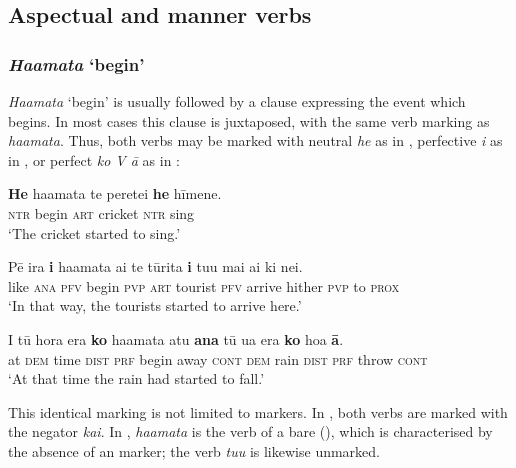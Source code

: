 \subsection{Aspectual and manner verbs}\label{sec:11.3.2}
\subsubsection{\textit{Ha{\ꞌ}amata} ‘begin’}\label{sec:11.3.2.1}
\textit{Ha{\ꞌ}amata} ‘begin’ is usually followed by a clause expressing the event which begins. In most cases this clause is juxtaposed, with the same verb marking as \textit{\mbox{ha{\ꞌ}amata}}. Thus, both verbs may be marked with neutral \textit{he} as in , perfective \textit{i} as in , or perfect \textit{ko V {\ꞌ}ā} as in :

\ea\label{ex:11.42}
\gll \textbf{He} ha{\ꞌ}amata te perete{\ꞌ}i \textbf{he} hīmene. \\
\textsc{ntr} begin \textsc{art} cricket \textsc{ntr} sing \\

\glt 
‘The cricket started to sing.’ \textstyleExampleref{[R212.052]} 
\z

\ea\label{ex:11.43}
\gll Pē ira \textbf{i} ha{\ꞌ}amata ai te tūrita \textbf{i} tu{\ꞌ}u mai ai ki nei.\\
like \textsc{ana} \textsc{pfv} begin \textsc{pvp} \textsc{art} tourist \textsc{pfv} arrive hither \textsc{pvp} to \textsc{prox}\\

\glt 
‘In that way, the tourists started to arrive here.’ \textstyleExampleref{[R376.076]} 
\z

\ea\label{ex:11.44}
\gll {\ꞌ}I tū hora era \textbf{ko} ha{\ꞌ}amata atu \textbf{{\ꞌ}ana} tū {\ꞌ}ua era \textbf{ko} hoa \textbf{{\ꞌ}ā}.\\
at \textsc{dem} time \textsc{dist} \textsc{prf} begin away \textsc{cont} \textsc{dem} rain \textsc{dist} \textsc{prf} throw \textsc{cont}\\

\glt
‘At that time the rain had started to fall.’ \textstyleExampleref{[R536.042]} 
\z

This identical marking is not limited to  markers. In , both verbs are marked with the negator \textit{kai}. In , \textit{ha{\ꞌ}amata} is the verb of a bare  (), which is characterised by the absence of an  marker; the  verb \textit{tu{\ꞌ}u} is likewise unmarked.

